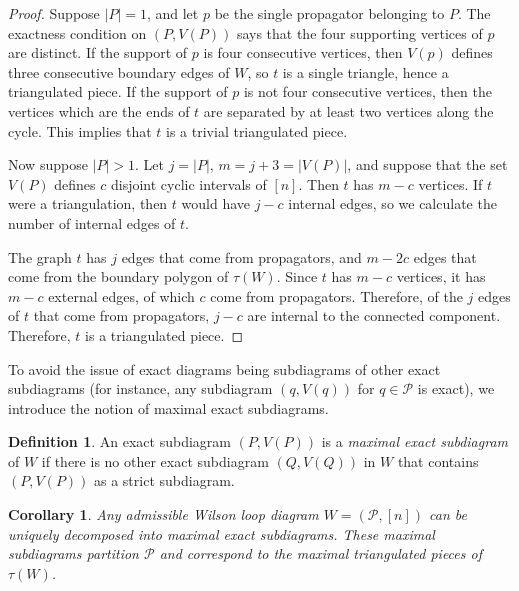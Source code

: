 \documentclass[11pt]{article}
\newcommand{\cP}{\mathcal{P}}
\newtheorem{cor}[thm]{Corollary}
\theoremstyle{remark}
\theoremstyle{definition}
\newtheorem{dfn}[thm]{Definition}
\begin{document}
\begin{proof}
Suppose $|P|=1$, and let $p$ be the single propagator belonging to $P$. The exactness condition on $(P, V(P))$ says that the four supporting vertices of $p$ are distinct.  If the support of $p$ is four consecutive vertices, then $V(p)$ defines three consecutive boundary edges of $W$, so $t$ is a single triangle, hence a triangulated piece.  If the support of $p$ is not four consecutive vertices, then the vertices which are the ends of $t$ are separated by at least two vertices along the cycle.  This implies that $t$ is a trivial triangulated piece.

Now suppose $|P|>1$.  Let $j=|P|$, $m= j+3=|V(P)|$, and 
suppose that the set $V(P)$ defines $c$ disjoint cyclic intervals of $[n]$. Then $t$ has $m-c$ vertices.  If $t$ were a triangulation, then $t$ would have $j -c$ internal edges, so we calculate the number of internal edges of $t$.

The graph $t$ has $j$ edges that come from propagators, and $m - 2c$ edges that come from the boundary polygon of $\tau(W)$. Since $t$ has $m-c$ vertices, it has $m-c$ external edges, of which $c$ come from propagators. Therefore, of the $j$ edges of $t$ that come from propagators, $j-c$ are internal to the connected component. Therefore, $t$ is a triangulated piece.


\end{proof}





To avoid the issue of exact diagrams being subdiagrams of other exact subdiagrams (for instance, any subdiagram $(q, V(q))$ for $q \in \cP$ is exact), we introduce the notion of maximal exact subdiagrams.

\begin{dfn}
An exact subdiagram $(P, V(P))$ is a {\em maximal exact subdiagram} of $W$ if there is no other exact subdiagram $(Q, V(Q))$ in $W$ that contains $(P,V(P))$ as a strict subdiagram.
\end{dfn}

\begin{cor} \label{uniqueproppartitioncor}
Any admissible Wilson loop diagram $W = (\cP, [n])$ can be uniquely decomposed into maximal exact subdiagrams. These maximal subdiagrams partition $\cP$ and correspond to the maximal triangulated pieces of $\tau(W)$.
\end{cor}
\end{document}
